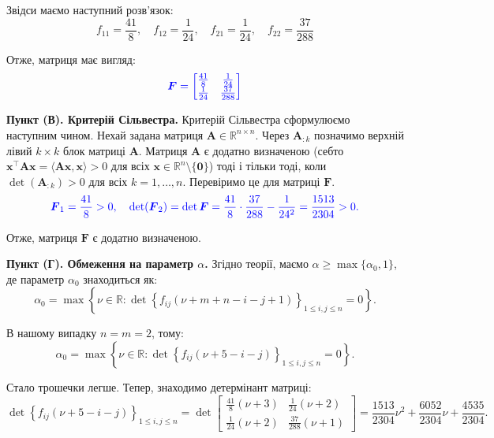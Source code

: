 \documentclass{hw_template}
\begin{document}
Звідси маємо наступний розв'язок:
\begin{equation*}
    f_{11} = \frac{41}{8}, \quad f_{12} = \frac{1}{24}, \quad 
    f_{21} = \frac{1}{24}, \quad f_{22} = \frac{37}{288}
\end{equation*}

Отже, матриця має вигляд:
\begin{equation*}
    \textcolor{blue}{\boldsymbol{F} = \begin{bmatrix}
        \frac{41}{8} & \frac{1}{24} \\
        \frac{1}{24} & \frac{37}{288}
    \end{bmatrix}}
\end{equation*}

\textbf{Пункт (В). Критерій Сільвестра.} Критерій Сільвестра сформулюємо
наступним чином. Нехай задана матриця $\boldsymbol{A} \in \mathbb{R}^{n \times
n}$. Через $\boldsymbol{A}_{:k}$ позначимо верхній лівий $k \times k$ блок
матриці $\boldsymbol{A}$. Матриця $\boldsymbol{A}$ є додатно визначеною (себто
$\mathbf{x}^{\top}\boldsymbol{A}\mathbf{x} = \langle \boldsymbol{A}\mathbf{x}, \mathbf{x}\rangle > 0$ для всіх $\mathbf{x} \in
\mathbb{R}^n \setminus \{\mathbf{0}\}$) тоді і тільки тоді, коли $\det(\boldsymbol{A}_{:k}) > 0$ для всіх
$k=1,\ldots,n$. Перевіримо це для матриці $\boldsymbol{F}$.
\begin{equation*}
    \textcolor{blue}{\boldsymbol{F}_1 = \frac{41}{8} > 0, \quad \det(\boldsymbol{F}_2) = \det \boldsymbol{F} = \frac{41}{8} \cdot \frac{37}{288} - \frac{1}{24^2} = \frac{1513}{2304} > 0.}
\end{equation*}

Отже, матриця $\boldsymbol{F}$ є додатно визначеною.

\textbf{Пункт (Г). Обмеження на параметр $\alpha$.} Згідно теорії, маємо $\alpha \geq \max\{\alpha_0,1\}$, де параметр $\alpha_0$ знаходиться як:
\begin{equation*}
    \alpha_0 = \max\left\{\nu \in \mathbb{R}: \det \left\{f_{ij}(\nu+m+n-i-j+1)\right\}_{1 \leq i,j \leq n} = 0\right\}.
\end{equation*}

В нашому випадку $n=m=2$, тому:
\begin{equation*}
    \alpha_0 = \max\left\{\nu \in \mathbb{R}: \det \left\{f_{ij}(\nu+5-i-j)\right\}_{1 \leq i,j \leq n} = 0\right\}.
\end{equation*}

Стало трошечки легше. Тепер, знаходимо детермінант матриці:
\begin{equation*}
    \det \left\{f_{ij}(\nu+5-i-j)\right\}_{1 \leq i,j \leq n} = \det\begin{bmatrix}
        \frac{41}{8}(\nu+3) & \frac{1}{24}(\nu+2) \\
        \frac{1}{24}(\nu+2) & \frac{37}{288}(\nu+1)
    \end{bmatrix} = \frac{1513}{2304}\nu^2 + \frac{6052}{2304}\nu + \frac{4535}{2304}.
\end{equation*}
\end{document}
